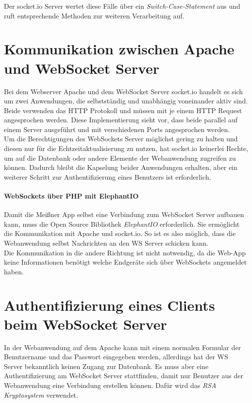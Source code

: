 Der socket.io Server wertet diese Fälle über ein \emph{Switch-Case-Statement} aus und ruft entsprechende Methoden zur weiteren Verarbeitung auf.

\section{Kommunikation zwischen Apache und WebSocket Server}
Bei dem Webserver Apache und dem WebSocket Server socket.io handelt es sich um zwei Anwendungen, die selbstständig und unabhängig voneinander aktiv sind. Beide verwenden das HTTP Protokoll und müssen mit je einem HTTP Request angesprochen werden. Diese Implementierung sieht vor, dass beide parallel auf einem Server ausgeführt und mit verschiedenen Ports angesprochen werden.\\
Um die Berechtigungen des WebSockets Server möglichst gering zu halten und diesen nur für die Echtzeitaktualisierung zu nutzen, hat socket.io keinerlei Rechte, um auf die Datenbank oder andere Elemente der Webanwendung zugreifen zu können. Dadurch bleibt die Kapselung beider Anwendungen erhalten, aber ein weiterer Schritt zur Authentifizierung eines Benutzers ist erforderlich.

\paragraph{WebSockets über PHP mit ElephantIO}
Damit die Meißner App selbst eine Verbindung zum WebSocket Server aufbauen kann, muss die Open Source Bibliothek \emph{ElephantIO} \cite{elephant.io} erforderlich. Sie ermöglicht die Kommunikation mit Apache und socket.io. So ist es also möglich, dass die Webanwendung selbst Nachrichten an den WS Server schicken kann.\\
Die Kommunikation in die andere Richtung ist nicht notwendig, da die Web-App keine Informationen benötigt welche Endgeräte sich über WebSockets angemeldet haben.


\section{Authentifizierung eines Clients beim WebSocket Server}
In der Webanwendung auf dem Apache kann mit einem normalen Formular der Benutzername und das Passwort eingegeben werden, allerdings hat der WS Server bekanntlich keinen Zugang zur Datenbank. Es muss aber eine Authentifizierung am WebSocket Server stattfinden, damit nur Benutzer aus der Webanwendung eine Verbindung erstellen können. Dafür wird das \emph{RSA Kryptosystem} verwendet.

